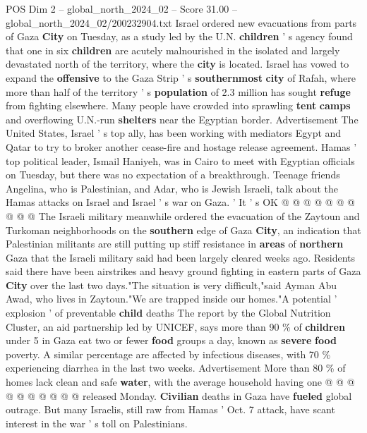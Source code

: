 \begin{textsample}{POS Dim 2 – global\_north\_2024\_02 – Score 31.00 – global\_north\_2024\_02/200232904.txt}  \label{ex:f2_pos_146}
Israel ordered new evacuations from parts of Gaza \textbf{City} on Tuesday, as a study led by the U.N. \textbf{children} ' s agency found that one in six \textbf{children} are acutely malnourished in the isolated and largely devastated north of the territory, where the \textbf{city} is located.
Israel has vowed to expand the \textbf{offensive} to the Gaza Strip ' s \textbf{southernmost} \textbf{city} of Rafah, where more than half of the territory ' s \textbf{population} of 2.3 million has sought \textbf{refuge} from fighting elsewhere.
Many people have crowded into sprawling \textbf{tent} \textbf{camps} and overflowing U.N.-run \textbf{shelters} near the Egyptian border.
Advertisement The United States, Israel ' s top ally, has been working with mediators Egypt and Qatar to try to broker another cease-fire and hostage release agreement.
Hamas ' top political leader, Ismail Haniyeh, was in Cairo to meet with Egyptian officials on Tuesday, but there was no expectation of a breakthrough.
Teenage friends Angelina, who is Palestinian, and Adar, who is Jewish Israeli, talk about the Hamas attacks on Israel and Israel ' s war on Gaza. ' It ' s OK @ @ @ @ @ @ @ @ @ @ The Israeli military meanwhile ordered the evacuation of the Zaytoun and Turkoman neighborhoods on the \textbf{southern} edge of Gaza \textbf{City}, an indication that Palestinian militants are still putting up stiff resistance in \textbf{areas} of \textbf{northern} Gaza that the Israeli military said had been largely cleared weeks ago.
Residents said there have been airstrikes and heavy ground fighting in eastern parts of Gaza \textbf{City} over the last two days."The situation is very difficult,"said Ayman Abu Awad, who lives in Zaytoun."We are trapped inside our homes."A potential ' explosion ' of preventable \textbf{child} deaths The report by the Global Nutrition Cluster, an aid partnership led by UNICEF, says more than 90 \% of \textbf{children} under 5 in Gaza eat two or fewer \textbf{food} groups a day, known as \textbf{severe} \textbf{food} poverty.
A similar percentage are affected by infectious diseases, with 70 \% experiencing diarrhea in the last two weeks.
Advertisement More than 80 \% of homes lack clean and safe \textbf{water}, with the average household having one @ @ @ @ @ @ @ @ @ @ released Monday. \textbf{Civilian} deaths in Gaza have \textbf{fueled} global outrage.
But many Israelis, still raw from Hamas ' Oct. 7 attack, have scant interest in the war ' s toll on Palestinians.

\end{textsample}
